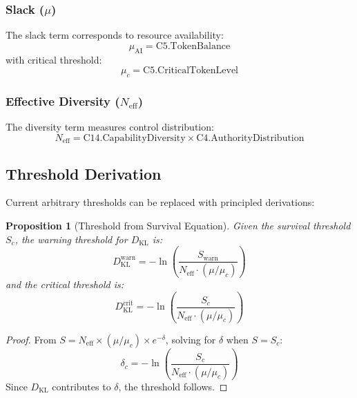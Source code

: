 \documentclass[11pt,a4paper]{article}
\newtheorem{proposition}[theorem]{Proposition}
\newcommand{\Neff}{N_{\text{eff}}}
\newcommand{\muc}{\mu_c}
\newcommand{\DKL}{D_{\text{KL}}}
\begin{document}
\subsubsection{Slack ($\mu$)}

The slack term corresponds to resource availability:
\begin{equation}
\mu_{\text{AI}} = \text{C5.TokenBalance}
\end{equation}
with critical threshold:
\begin{equation}
\muc = \text{C5.CriticalTokenLevel}
\end{equation}

\subsubsection{Effective Diversity ($\Neff$)}

The diversity term measures control distribution:
\begin{equation}
\Neff = \text{C14.CapabilityDiversity} \times \text{C4.AuthorityDistribution}
\end{equation}

\subsection{Threshold Derivation}

Current arbitrary thresholds can be replaced with principled derivations:

\begin{proposition}[Threshold from Survival Equation]
Given the survival threshold $S_c$, the warning threshold for $\DKL$ is:
\begin{equation}
\DKL^{\text{warn}} = -\ln\left(\frac{S_{\text{warn}}}{\Neff \cdot (\mu/\muc)}\right)
\end{equation}
and the critical threshold is:
\begin{equation}
\DKL^{\text{crit}} = -\ln\left(\frac{S_c}{\Neff \cdot (\mu/\muc)}\right)
\end{equation}
\end{proposition}

\begin{proof}
From $S = \Neff \times (\mu/\muc) \times e^{-\delta}$, solving for $\delta$ when $S = S_c$:
\begin{equation}
\delta_c = -\ln\left(\frac{S_c}{\Neff \cdot (\mu/\muc)}\right)
\end{equation}
Since $\DKL$ contributes to $\delta$, the threshold follows.
\end{proof}
\end{document}

